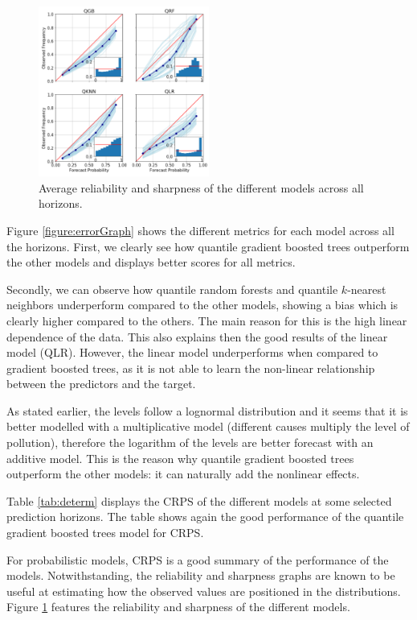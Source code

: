 \documentclass[a4paper,twocolumn,5p]{elsarticle}
\begin{document}
\begin{figure}
  \centering
  \includegraphics[width=0.5\textwidth]{reliability_sharpness}
  \caption{\label{figure:rel_sharp}Average reliability and sharpness
    of the different models across all horizons.}
\end{figure}

Figure \ref{figure:errorGraph} shows the different metrics for each
model across all the horizons. First, we clearly see how 
quantile gradient
boosted trees outperform the other models and displays better scores
for all metrics.

Secondly, we can observe how quantile random forests and 
quantile $k$-nearest
neighbors underperform compared to the other models, showing a bias
which is clearly higher compared to the others.  The main reason for
this is the high linear dependence of the data. This also explains
then the good results of the linear model (QLR).  However, the linear
model underperforms when compared to gradient boosted trees, as it is
not able to learn the non-linear relationship between the predictors
and the target.

As stated earlier, the \no levels follow a lognormal
distribution and it seems that it is better modelled with a
multiplicative model (different causes multiply the level of
pollution), therefore the logarithm of the \no levels
are better forecast with an additive model. 
This is the reason why
quantile gradient boosted trees outperform 
the other models: it can naturally
add the nonlinear effects.

Table \ref{tab:determ} displays the CRPS of the different models at
some selected prediction horizons. The table shows again the good
performance of the quantile 
gradient boosted trees model for CRPS.

For probabilistic models, CRPS is a good summary of the performance of
the models. Notwithstanding, the reliability and sharpness graphs are
known to be useful at estimating how the observed values are
positioned in the distributions.  Figure \ref{figure:rel_sharp}
features the reliability and sharpness of the different models.
\end{document}
